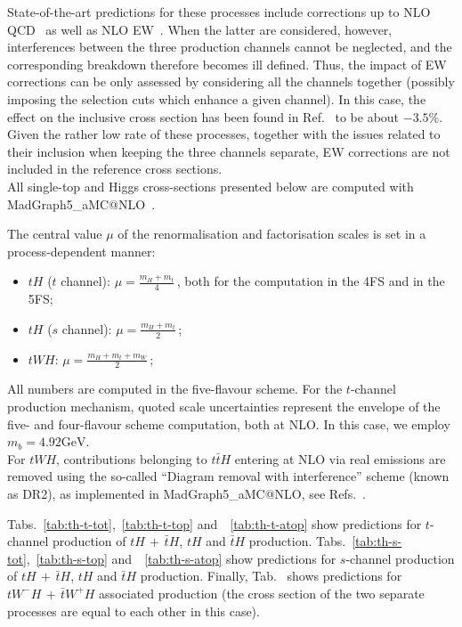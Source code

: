 State-of-the-art predictions
for these processes include corrections up to NLO QCD~\cite{Demartin:2015uha,Demartin:2016axk} as well as NLO EW~\cite{Pagani:2020mov}. When
the latter are considered, however, interferences between the three production channels cannot be neglected, and the corresponding breakdown 
therefore becomes ill defined. Thus, the impact of EW corrections can be only assessed
by considering all the channels together (possibly imposing the selection cuts which enhance a given channel). In this case, the effect on the inclusive
cross section has been found in Ref.~\cite{Pagani:2020mov} to be about $-3.5\%$. Given the rather low rate of these processes, together with
the issues related to their inclusion when keeping the three channels separate, EW
corrections are not included in the reference cross sections.\\

All single-top and Higgs cross-sections presented below are computed with {\sc MadGraph5\_aMC@NLO}~\cite{Alwall:2014hca,Frederix:2018nkq}. 

The central value $\mu$ of the renormalisation and factorisation scales is set in a process-dependent manner:
\begin{itemize}
    \item $tH$ ($t$ channel): $\mu= \frac{m_H+m_t}{4}\,$, both for the computation in the 4FS and in the 5FS;
    \item $tH$ ($s$ channel): $\mu= \frac{m_H+m_t}{2}\,$;
    \item $tWH$: $\mu= \frac{m_H+m_t+m_W}{2}\,$;
\end{itemize}
All numbers are computed in the five-flavour scheme. For the $t$-channel production mechanism, quoted scale uncertainties represent the envelope of the
five- and four-flavour scheme computation, both at NLO. In this case, we employ $m_b=4.92 \textrm{GeV}$.\\
For $tWH$, contributions belonging to $t\bar t H$ entering at NLO via real emissions are removed using the so-called ``Diagram removal with interference'' 
scheme (known as DR2), as implemented in {\sc MadGraph5\_aMC@NLO}, see Refs.~\cite{Demartin:2016axk,Frixione:2019fxg}.

Tabs.~\ref{tab:th-t-tot},~\ref{tab:th-t-top} and~~\ref{tab:th-t-atop}
show predictions for $t$-channel production of $tH\,+\,\bar tH$, $tH$ and $\bar tH$ production. Tabs.~\ref{tab:th-s-tot},~\ref{tab:th-s-top} and~~\ref{tab:th-s-atop}
show predictions for $s$-channel production of $tH\,+\,\bar tH$, $tH$ and $\bar tH$ production. Finally, Tab.~\label{tab:thw-tot}
shows predictions for $tW^-H \,+ \,\bar t W^+H$ associated production (the cross section of the two separate processes are equal to each other in this case).


